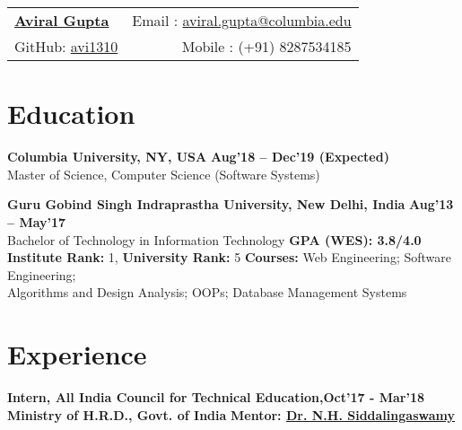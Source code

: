 \documentclass[margin,line]{res}
\begin{document}
\begin{tabular*}{\textwidth}{l@{\extracolsep{\fill}}r}
  \textbf{\href{https://www.linkedin.com/in/aviral13/}{\Large Aviral Gupta}} & Email : \href{mailto:aviral.gupta@columbia.edu}{aviral.gupta@columbia.edu}\\
  GitHub: {\href{https://github.com/avi1310}{avi1310}} & Mobile : (+91) 8287534185 \\
\end{tabular*}

\begin{resume}


\section{\sc Education}
{\bf Columbia University, NY, USA} \hfill {\bf Aug'18 -- Dec'19 (Expected)}\\
Master of Science, Computer Science (Software Systems) %


{\bf Guru Gobind Singh Indraprastha University, New Delhi, India} \hfill {\bf Aug'13 -- May'17}\\
Bachelor of Technology in Information Technology \hfill {\bf GPA (WES): 3.8/4.0}\\
{\bf Institute Rank: }1, {\bf University Rank: }5
{\bf Courses:} Web Engineering; Software Engineering;\\
Algorithms and Design Analysis; OOPs; Database Management Systems 

\section{\sc Experience}
{\bf Intern, All India Council for Technical Education,}\hfill {\bf Oct'17 - Mar'18}\\  
{\bf Ministry of H.R.D., Govt. of India} \hfill {\bf Mentor: {\href{https://www.aicte-india.org/leadership/dr-nh-siddalingaswamy}{ Dr. N.H. Siddalingaswamy}}}


\end{resume}
\end{document}
